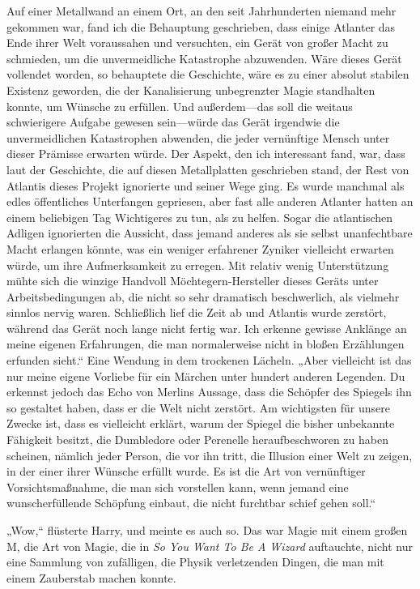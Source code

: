 Auf einer Metallwand an einem Ort, an den seit Jahrhunderten niemand mehr gekommen war, fand ich die Behauptung geschrieben, dass einige Atlanter das Ende ihrer Welt voraussahen und versuchten, ein Gerät von großer Macht zu schmieden, um die unvermeidliche Katastrophe abzuwenden. Wäre dieses Gerät vollendet worden, so behauptete die Geschichte, wäre es zu einer absolut stabilen Existenz geworden, die der Kanalisierung unbegrenzter Magie standhalten konnte, um Wünsche zu erfüllen. Und außerdem—das soll die weitaus schwierigere Aufgabe gewesen sein—würde das Gerät irgendwie die unvermeidlichen Katastrophen abwenden, die jeder vernünftige Mensch unter dieser Prämisse erwarten würde. Der Aspekt, den ich interessant fand, war, dass laut der Geschichte, die auf diesen Metallplatten geschrieben stand, der Rest von Atlantis dieses Projekt ignorierte und seiner Wege ging. Es wurde manchmal als edles öffentliches Unterfangen gepriesen, aber fast alle anderen Atlanter hatten an einem beliebigen Tag Wichtigeres zu tun, als zu helfen. Sogar die atlantischen Adligen ignorierten die Aussicht, dass jemand anderes als sie selbst unanfechtbare Macht erlangen könnte, was ein weniger erfahrener Zyniker vielleicht erwarten würde, um ihre Aufmerksamkeit zu erregen. Mit relativ wenig Unterstützung mühte sich die winzige Handvoll Möchtegern-Hersteller dieses Geräts unter Arbeitsbedingungen ab, die nicht so sehr dramatisch beschwerlich, als vielmehr sinnlos nervig waren. Schließlich lief die Zeit ab und Atlantis wurde zerstört, während das Gerät noch lange nicht fertig war. Ich erkenne gewisse Anklänge an meine eigenen Erfahrungen, die man normalerweise nicht in bloßen Erzählungen erfunden sieht.“
Eine Wendung in dem trockenen Lächeln.
„Aber vielleicht ist das nur meine eigene Vorliebe für ein Märchen unter hundert anderen Legenden. Du erkennst jedoch das Echo von Merlins Aussage, dass die Schöpfer des Spiegels ihn so gestaltet haben, dass er die Welt nicht zerstört. Am wichtigsten für unsere Zwecke ist, dass es vielleicht erklärt, warum der Spiegel die bisher unbekannte Fähigkeit besitzt, die Dumbledore oder Perenelle heraufbeschworen zu haben scheinen, nämlich jeder Person, die vor ihn tritt, die Illusion einer Welt zu zeigen, in der einer ihrer Wünsche erfüllt wurde. Es ist die Art von vernünftiger Vorsichtsmaßnahme, die man sich vorstellen kann, wenn jemand eine wunscherfüllende Schöpfung einbaut, die nicht furchtbar schief gehen soll.“

„Wow,“ flüsterte Harry, und meinte es auch so. Das war Magie mit einem großen M, die Art von Magie, die in \emph{So You Want To Be A Wizard} auftauchte, nicht nur eine Sammlung von zufälligen, die Physik verletzenden Dingen, die man mit einem Zauberstab machen konnte.

